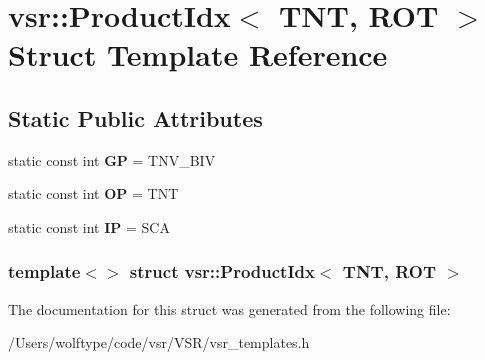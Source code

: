 \hypertarget{structvsr_1_1_product_idx_3_01_t_n_t_00_01_r_o_t_01_4}{\section{vsr\-:\-:Product\-Idx$<$ T\-N\-T, R\-O\-T $>$ Struct Template Reference}
\label{structvsr_1_1_product_idx_3_01_t_n_t_00_01_r_o_t_01_4}
}
\subsection*{Static Public Attributes}
\begin{DoxyCompactItemize}
\item 
\hypertarget{structvsr_1_1_product_idx_3_01_t_n_t_00_01_r_o_t_01_4_aedd31faeb25801236444db314cbec30b}{static const int {\bfseries G\-P} = T\-N\-V\-\_\-\-B\-I\-V}\label{structvsr_1_1_product_idx_3_01_t_n_t_00_01_r_o_t_01_4_aedd31faeb25801236444db314cbec30b}

\item 
\hypertarget{structvsr_1_1_product_idx_3_01_t_n_t_00_01_r_o_t_01_4_a5daa6caa8e95ffcfbf6507807699693c}{static const int {\bfseries O\-P} = T\-N\-T}\label{structvsr_1_1_product_idx_3_01_t_n_t_00_01_r_o_t_01_4_a5daa6caa8e95ffcfbf6507807699693c}

\item 
\hypertarget{structvsr_1_1_product_idx_3_01_t_n_t_00_01_r_o_t_01_4_a4ffb861feda1c065ed0422b0102b664e}{static const int {\bfseries I\-P} = S\-C\-A}\label{structvsr_1_1_product_idx_3_01_t_n_t_00_01_r_o_t_01_4_a4ffb861feda1c065ed0422b0102b664e}

\end{DoxyCompactItemize}
\subsubsection*{template$<$$>$ struct vsr\-::\-Product\-Idx$<$ T\-N\-T, R\-O\-T $>$}



The documentation for this struct was generated from the following file\-:\begin{DoxyCompactItemize}
\item 
/\-Users/wolftype/code/vsr/\-V\-S\-R/vsr\-\_\-templates.\-h\end{DoxyCompactItemize}
